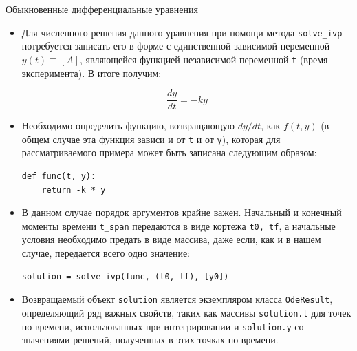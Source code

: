 \documentclass[aspectratio=169, mathserif]{beamer}	%
\begin{document}
\begin{frame}[fragile]{Обыкновенные дифференциальные уравнения}
\scriptsize
\begin{itemize}
	\item Для численного решения данного уравнения при помощи метода \texttt{solve\_ivp} потребуется записать его в форме с единственной зависимой переменной $y(t) \equiv \left[A\right]$, являющейся функцией независимой переменной \texttt{t} (время эксперимента). В итоге получим:
	
	$$\dfrac{dy}{dt} = -ky$$
	
	\item Необходимо определить функцию, возвращающую $dy/dt$, как $f(t, y)$ (в общем случае эта функция зависи и от \texttt{t} и от \texttt{y}), которая для рассматриваемого примера может быть записана следующим образом:
	
\begin{lstlisting}[language=iPython, numbers=none, frame=none, ]
def func(t, y):
    return -k * y
\end{lstlisting}
	
	\item 	В данном случае порядок аргументов крайне важен. Начальный и конечный моменты времени \texttt{t\_span} передаются в виде кортежа \texttt{t0, tf}, а начальные условия необходимо предать в виде массива, даже если, как и в нашем случае, передается всего одно значение:
	
\begin{lstlisting}[language=iPython, numbers=none, frame=none, ]
solution = solve_ivp(func, (t0, tf), [y0])
\end{lstlisting}
	
	\item Возвращаемый объект \texttt{solution} является экземпляром класса \texttt{OdeResult}, определяющий ряд важных свойств, таких как массивы \texttt{solution.t} для точек по времени, использованных при интегрировании и \texttt{solution.y} со значениями решений, полученных в этих точках по времени.
\end{itemize}
\vfil
\end{frame}
\end{document}

